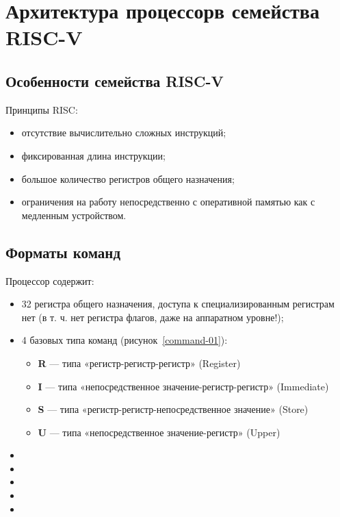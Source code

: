 \chapter{Архитектура процессорв семейства RISC-V}

\section{Особенности семейства RISC-V}

Принципы RISC:
\begin{itemize}
    \item отсутствие вычислительно сложных инструкций;
    \item фиксированная длина инструкции;
    \item большое количество регистров общего назначения;
    \item ограничения на работу непосредственно с оперативной памятью как с медленным устройством.
\end{itemize}


\section{Форматы команд}

Процессор содержит:
\begin{itemize}
    \item 32 регистра общего назначения, доступа к специализированным регистрам нет (в т. ч. нет регистра флагов, даже на аппаратном уровне!);
    \item 4 базовых типа команд (рисунок~\ref{command-01}):
    \begin{itemize}
        \item \textbf{R} --- типа «регистр-регистр-регистр» (Register)
        \item \textbf{I} --- типа «непосредственное значение-регистр-регистр» (Immediate)
        \item \textbf{S} --- типа «регистр-регистр-непосредственное значение» (Store)
        \item \textbf{U} --- типа «непосредственное значение-регистр» (Upper)
    \end{itemize}
    \item
    \item
    \item
    \item
    \item
\end{itemize}

